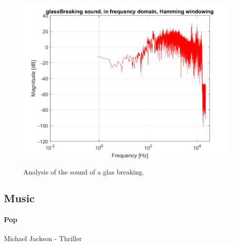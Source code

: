 \begin{figure}[htb]
	{\includegraphics[width=0.45\linewidth]{code/glassBreaking_figure5.png}}
	\caption{Analysis of the sound of a glas breaking.}\label{fig:glassBreaking}
\end{figure}


\subsection{Music}

\paragraph{Pop}
Michael Jackson - Thriller

